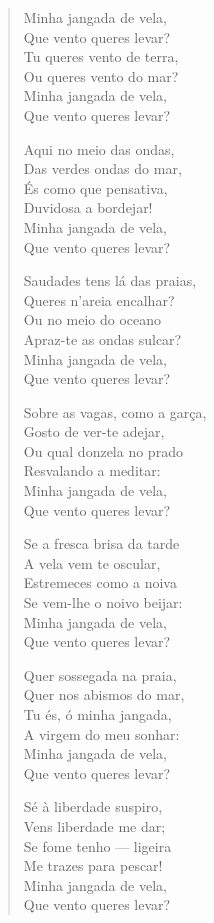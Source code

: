 \documentclass[10pt,a5paper,oneside]{book}
\begin{document}
\begin{verse}
Minha jangada de vela,\\
Que vento queres levar?\\
Tu queres vento de terra,\\
Ou queres vento do mar?\\
Minha jangada de vela,\\
Que vento queres levar?

Aqui no meio das ondas,\\
Das verdes ondas do mar,\\
És como que pensativa,\\
Duvidosa a bordejar!\\
Minha jangada de vela,\\
Que vento queres levar?

Saudades tens lá das praias,\\
Queres n'areia encalhar?\\
Ou no meio do oceano\\
Apraz-te as ondas sulcar?\\
Minha jangada de vela,\\
Que vento queres levar?

Sobre as vagas, como a garça,\\
Gosto de ver-te adejar,\\
Ou qual donzela no prado\\
Resvalando a meditar:\\
Minha jangada de vela,\\
Que vento queres levar?

Se a fresca brisa da tarde\\
A vela vem te oscular,\\
Estremeces como a noiva\\
Se vem-lhe o noivo beijar:\\
Minha jangada de vela,\\
Que vento queres levar?

Quer sossegada na praia,\\
Quer nos abismos do mar,\\
Tu és, ó minha jangada,\\
A virgem do meu sonhar:\\
Minha jangada de vela,\\
Que vento queres levar?

Sé à liberdade suspiro,\\
Vens liberdade me dar;\\
Se fome tenho --- ligeira\\
Me trazes para pescar!\\
Minha jangada de vela,\\
Que vento queres levar?


\end{verse}
\end{document}

